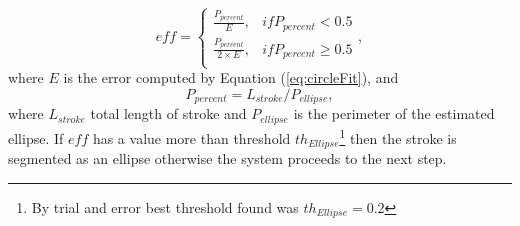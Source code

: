\documentclass[preprint,10pt,5p,twocolumn]{elsarticle}
\begin{document}
 \begin{equation}
eff= \begin{cases} 
\frac{P_{percent}}{E},&if P_{percent}< 0.5 \\
\frac{P_{percent}}{2\times E},&if P_{percent}\geq 0.5 \\
\end{cases},
\label{eq:circleError}
\end{equation}
 where $E$ is the error computed by Equation (\ref{eq:circleFit}), and 
\[
P_{percent}  = L_{stroke} /P_{ellipse}, 
\]
 where $L_{stroke}$ total length of stroke and $P_{ellipse} $ is the perimeter of the estimated ellipse. If $eff$ has a value more than threshold $th_{Ellipse}$\footnote{By trial and error best threshold found was $th_{Ellipse}=0.2$} then the stroke is segmented as an ellipse otherwise the system proceeds to the next step. 
\end{document}
